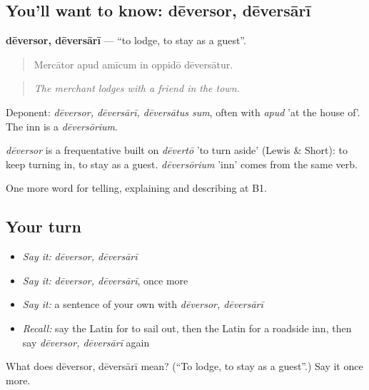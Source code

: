 \subsection*{You'll want to know: dēversor, dēversārī}
\textbf{dēversor, dēversārī} — \textquotedblleft{}to lodge, to stay as a guest\textquotedblright{}.

\begin{quote}
Mercātor apud amīcum in oppidō dēversātur.
\end{quote}

\begin{quote}
\emph{The merchant lodges with a friend in the town.}
\end{quote}

Deponent: \emph{dēversor, dēversārī, dēversātus sum}, often with \emph{apud} 'at the house of'. The inn is a \emph{dēversōrium}.

\begin{cousinweb}
\emph{dēversor} is a frequentative built on \emph{dēvertō} 'to turn aside' (Lewis \& Short): to keep turning in, to stay as a guest. \emph{dēversōrium} 'inn' comes from the same verb.
\end{cousinweb}

\begin{grammarlens}[title={What you've built}]
One more word for telling, explaining and describing at B1.
\end{grammarlens}

\subsection*{Your turn}
\begin{itemize}
\raggedright
  \item \emph{Say it:} \emph{dēversor, dēversārī}
  \item \emph{Say it:} \emph{dēversor, dēversārī}, once more
  \item \emph{Say it:} a sentence of your own with \emph{dēversor, dēversārī}
  \item \emph{Recall:} say the Latin for to sail out, then the Latin for a roadside inn, then say \emph{dēversor, dēversārī} again
\end{itemize}

\begin{tcolorbox}[breakable,colback=teal!4,colframe=teal!35!black,title={Before you move on}]
What does dēversor, dēversārī mean? (\textquotedblleft{}To lodge, to stay as a guest\textquotedblright{}.) Say it once more.
\end{tcolorbox}
